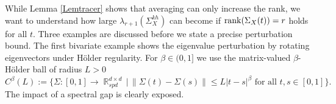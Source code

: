 \documentclass[preprint,aos]{imsart}
\numberwithin{equation}{section}
\theoremstyle{remark}
\DeclareMathOperator{\R}{{\mathbb R}}
\DeclareMathOperator{\trace}{trace}
\renewcommand{\subset}{\subseteq}
\providecommand{\abs}[1]{\lvert #1 \rvert}
\providecommand{\norm}[1]{\lVert #1 \rVert}
\renewcommand{\le}{\leqslant}
\renewcommand{\ge}{\geqslant}
\begin{document}
\begin{comment}
\begin{proof}
 To see this,
observe that by the variational characterisation of eigenvalues $\trace_{\ge r}(S)=\inf_{V:\dim(V)=d-r}\trace(P_{V}S|_{V})$ holds for linear subspaces $V\subset\R^d$ and their orthogonal projections $P_{V}$. This implies that  $S\mapsto \trace_{\ge r}(S)$ is concave, which gives \eqref{Eqtracer} by Jensen's inequality.
If $\rank(\Sigma(t))\ge r$ holds for $t$ in a set of positive Borel measure on $[0,h]$, then $\trace_{\ge r}(\Sigma(t))$ is positive there as well and $\rank(h^{-1}\int_{0}^{h}\Sigma(t)dt)\ge r$ follows.
\end{proof}
\end{comment}

While Lemma \ref{Lemtracer} shows that averaging can only increase the rank, we want to understand how large  $\lambda_{r+1}(\Sigma_X^{kh})$ can become if $\operatorname{rank}(\Sigma_X(t))=r$ holds for all $t$. Three examples are discussed before we state a precise perturbation bound. The first bivariate example shows the eigenvalue perturbation by rotating eigenvectors under H\"older regularity. For $\beta\in(0,1]$ we use the matrix-valued $\beta$-H\"older ball of radius $L>0$
\[ C^\beta(L):=\{\Sigma: [0,1]\to\R_{spd}^{d\times d}\,|\, \norm{\Sigma(t)-\Sigma(s)}\le L\abs{t-s}^\beta\text{ for all } t,s\in [0,1]\}.
\]
The impact of a spectral gap is clearly exposed.
\end{document}
